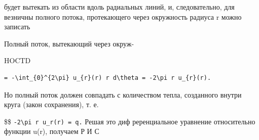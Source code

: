 \documentclass[
  ukrainian,
]{article}
\begin{document}
будет вытекать из области вдоль радиальных линий, и, следовательно, для
везничны полного потока, протекающего через окружность радиуса r можно
записать

Полный поток, вытекающий через окруж-

HOCTD

\begin{verbatim}
= -\int_{0}^{2\pi} u_{r}(r) r d\theta = -2\pi r u_{r}(r).
\end{verbatim}

Но полный поток должен совпадать с количеством тепла, созданного внутри
круга (закон сохранения), т. е.

\$\$ \texttt{-2\textbackslash{}pi\ r\ u\_r(r)\ =\ q.} Решая это диф
реренциальное уравнение относительно функции u(r), получаем Р И С
\end{document}
